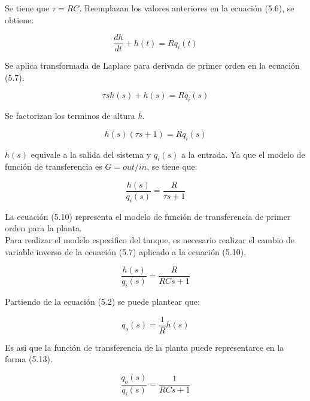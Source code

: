 \documentclass[a4paper,12pt,twoside]{proyectotanquesecci}
\begin{document}
Se tiene que $\tau =RC$. Reemplazan los valores anteriores en la ecuación (5.6), se obtiene:

\begin{equation}
\frac {dh}{dt}+h\left( t\right) =Rq_{i}\left( t\right)
\end{equation}

Se aplica transformada de Laplace para derivada de primer orden en la ecuación (5.7).

\begin{equation}
\tau sh\left( s\right) +h\left( s\right) =Rq_{i}\left( s\right)
\end{equation}

Se factorizan los terminos de altura \textit{h}.

\begin{equation}
h\left( s\right) \left( \tau s+1\right) =Rq_{i}\left( s\right)
\end{equation}

$h(s)$ equivale a la salida del sistema y $q_{i}(s)$ a la entrada. Ya que el modelo de función de transferencia es $G=out/in$, se tiene que:

\begin{equation}
\frac {h\left( s\right) }{q_{i}\left( s\right) }=\frac {R}{\tau s+1}
\end{equation}

La ecuación (5.10) representa el modelo de función de transferencia de primer orden para la planta. \\

Para realizar el modelo especifico del tanque, es necesario realizar el cambio de variable inverso de la ecuación (5.7) aplicado a la ecuación (5.10).

\begin{equation}
\frac {h\left( s\right) }{q_{i}\left( s\right) }=\frac {R}{RCs+1}
\end{equation}

Partiendo de la ecuación (5.2) se puede plantear que:

\begin{equation}
q_{o}(s)=\frac{1}{R}h(s)
\end{equation}

Es asi que la función de transferencia de la planta puede representarce en la forma (5.13).

\begin{equation}
\frac {q_{o}\left( s\right) }{q_{i}\left( s\right) }=\frac {1}{RCs+1}
\end{equation}
\end{document}
